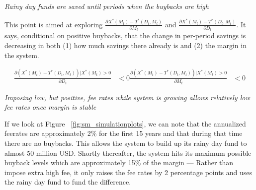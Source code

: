 \vspace{0.25cm}

\textit{Rainy day funds are saved until periods when the buybacks are high}

This point is aimed at exploring $\frac{\partial X^*(M_t) - T^*(D_t, M_t)}{\partial M_t}$ and
$\frac{\partial X^*(M_t) - T^*(D_t, M_t)}{\partial D_t}$. It says, conditional on positive buybacks,
that the change in per-period savings is decreasing in both (1) how much savings there already is
and (2) the margin in the system.

\begin{align*}
  \frac{\partial (X^*(M_t) - T^*(D_t, M_t)) | X^*(M_t) > 0}{\partial D_t} &< 0
  \frac{\partial (X^*(M_t) - T^*(D_t, M_t)) | X^*(M_t) > 0}{\partial M_t} &< 0
\end{align*}

\vspace{0.25cm}

\textit{Imposing low, but positive, fee rates while system is growing allows relatively low fee rates once margin is stable}

If we look at Figure ~\ref{fig:sm_simulationplots}, we can note that the annualized feerates are
approximately 2\% for the first 15 years and that during that time there are no buybacks. This
allows the system to build up its rainy day fund to almost 50 million USD. Shortly thereafter, the
system hits its maximum possible buyback levels which are approximately 15\% of the margin ---
Rather than impose extra high fee, it only raises the fee rates by 2 percentage points and uses
the rainy day fund to fund the difference.
